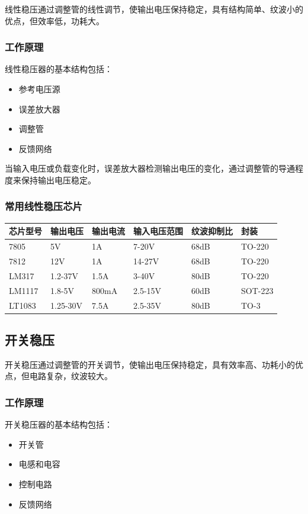 \documentclass[12pt,UTF8]{ctexbook}
\begin{document}
线性稳压通过调整管的线性调节，使输出电压保持稳定，具有结构简单、纹波小的优点，但效率低，功耗大。

\subsubsection{工作原理}

线性稳压器的基本结构包括：
\begin{itemize}
    \item 参考电压源
    \item 误差放大器
    \item 调整管
    \item 反馈网络
\end{itemize}

当输入电压或负载变化时，误差放大器检测输出电压的变化，通过调整管的导通程度来保持输出电压稳定。

\subsubsection{常用线性稳压芯片}

\begin{tabular}{|l|l|l|l|l|l|}
\hline
芯片型号 & 输出电压 & 输出电流 & 输入电压范围 & 纹波抑制比 & 封装 \\
\hline
7805 & 5V & 1A & 7-20V & 68dB & TO-220 \\
\hline
7812 & 12V & 1A & 14-27V & 68dB & TO-220 \\
\hline
LM317 & 1.2-37V & 1.5A & 3-40V & 80dB & TO-220 \\
\hline
LM1117 & 1.8-5V & 800mA & 2.5-15V & 60dB & SOT-223 \\
\hline
LT1083 & 1.25-30V & 7.5A & 2.5-35V & 80dB & TO-3 \\
\hline
\end{tabular}

\subsection{开关稳压}

开关稳压通过调整管的开关调节，使输出电压保持稳定，具有效率高、功耗小的优点，但电路复杂，纹波较大。

\subsubsection{工作原理}

开关稳压器的基本结构包括：
\begin{itemize}
    \item 开关管
    \item 电感和电容
    \item 控制电路
    \item 反馈网络
\end{itemize}
\end{document}
